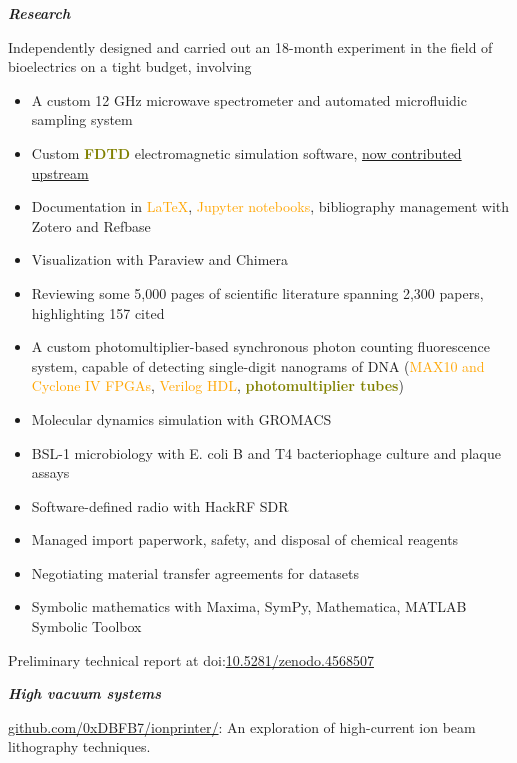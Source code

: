 \documentclass[fleqn,11pt]{article}
\newcommand{\ressection}[1]{\textbf{{\Large \textit{#1}}}\xrfill[0.1ex]{0.6pt}}
\newcommand{\sk}[1]{\textcolor{orange}{#1}}
\newcommand{\tec}[1]{\textcolor{olive}{\textbf{#1}}}
\begin{document}
\ressection{Research}

Independently designed and carried out an 18-month experiment in the field of bioelectrics on a tight budget, involving
\begin{itemize}\setlength\itemsep{-1em}
\item A custom 12 GHz microwave spectrometer and automated microfluidic sampling system
\item Custom \tec{FDTD} electromagnetic simulation software, \href{https://github.com/flaport/fdtd/pull/27}{now contributed upstream} 
\item Documentation in \sk{LaTeX}, \sk{Jupyter notebooks}, bibliography management with Zotero and Refbase
\item Visualization with Paraview and Chimera
\item Reviewing some 5,000 pages of scientific literature spanning 2,300 papers, highlighting 157 cited
\item A custom photomultiplier-based synchronous photon counting fluorescence system, capable of detecting single-digit nanograms of DNA (\sk{MAX10 and Cyclone IV FPGAs}, \sk{Verilog HDL}, \tec{photomultiplier tubes})
\item Molecular dynamics simulation with GROMACS
\item BSL-1 microbiology with E. coli B and T4 bacteriophage culture and plaque assays
\item Software-defined radio with HackRF SDR
\item Managed import paperwork, safety, and disposal of chemical reagents
\item Negotiating material transfer agreements for datasets
\item Symbolic mathematics with Maxima, SymPy, Mathematica, MATLAB Symbolic Toolbox
\end{itemize}

Preliminary technical report at doi:\href{https://doi.org/10.5281/zenodo.4568507}{10.5281/zenodo.4568507}
\pagebreak

\ressection{High vacuum systems}

\href{https://github.com/0xDBFB7/ionprinter/}{github.com/0xDBFB7/ionprinter/}: An exploration of high-current ion beam lithography techniques. 
\end{document}

